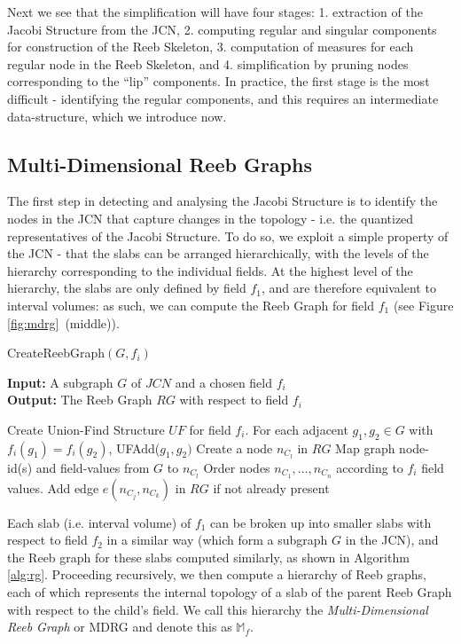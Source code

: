 \documentclass[twocolumn]{article}
\newcommand{\MDRG}{\mathbb{M}_f}
\newcommand{\algoref}[1]{Algorithm \ref{alg:#1}}
\begin{document}
Next we see that the simplification will have four stages: 1. extraction of the 
Jacobi Structure from the JCN, 2. computing regular and singular
components for construction of the Reeb Skeleton,
3. computation of measures for each regular node in the Reeb Skeleton,
and 4. simplification by pruning nodes corresponding to the ``lip'' components.  In practice, the first stage is the most difficult - identifying the regular 
components, and this requires an intermediate data-structure, which we introduce now.

\subsection{Multi-Dimensional Reeb Graphs}
\label{sec:MDRG}
The first step in detecting and analysing the Jacobi Structure is to identify the
nodes in the JCN that capture changes in the topology - i.e. the quantized 
representatives of the Jacobi Structure.  To do so, we exploit a simple property
of the JCN - that the slabs can be arranged hierarchically, with the levels of the
hierarchy corresponding to the individual fields. At the highest level of the 
hierarchy, the slabs are only defined by field $f_1$, and are therefore equivalent
to interval volumes: as such, we can compute the Reeb Graph for field
$f_1$ (see Figure \ref{fig:mdrg}~(middle)). 

\begin{algorithm}
\caption{{\sc CreateReebGraph}$(G, f_i)$}
\label{alg:rg}
{\bf Input:} A subgraph $G$ of $JCN$ and a chosen field $f_i$\\
{\bf Output:} The Reeb Graph $RG$ with respect to field $f_i$
\begin{algorithmic}[1]
\State Create Union-Find Structure $UF$ for field $f_i$.
\State For each adjacent $g_1,g_2 \in G$ with $f_i(g_1) = f_i(g_2)$, UFAdd($g_1,g_2)$
\State Create a node $n_{C_l}$ in $RG$
\State Map graph node-id(s) and field-values from $G$ to $n_{C_l}$
\EndFor
\State Order nodes ${n_{C_1},\ldots,n_{C_n}}$ according to $f_i$ field values.
\State Add edge $e(n_{C_j}, n_{C_k})$ in $RG$ if not already present
\EndIf
\EndFor
\State {}
\end{algorithmic}
\end{algorithm}

Each slab (i.e. interval volume) of $f_1$ can be broken up into smaller slabs with respect to
field $f_2$ in a similar way (which form a subgraph $G$ in the JCN), and
the Reeb graph for these slabs computed similarly, as
shown in \algoref{rg}. Proceeding recursively, we then compute a hierarchy of Reeb graphs, 
each of which represents the internal topology of a slab of the parent Reeb Graph  
with respect to the child's field.  We call this hierarchy the \emph{Multi-Dimensional
Reeb Graph} or MDRG and denote this as $\MDRG$.
\end{document}
